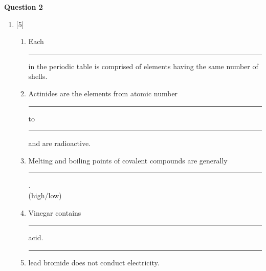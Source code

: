 \par
\noindent
\textbf{Question 2}\\
\begin{enumerate}[label=(\roman*)]

    \item \hfill [5]
        \begin{enumerate}[label=(\alph*)]
            \item Each \rule{1.5cm}{0.15mm} in the periodic table is comprised of elements 
                having the same number of shells.
            \item Actinides are the elements from atomic number \rule{1.5cm}{0.15mm} to 
                \rule{1.5cm}{0.15mm} and are radioactive.
            \item Melting and boiling points of covalent compounds are generally 
            \rule{1.5cm}{0.15mm}.\\ (high/low)
            \item Vinegar contains \rule{1.5cm}{0.15mm} acid.
            \item \rule{1.5cm}{0.15mm} lead bromide does not conduct electricity.
        \end{enumerate}

\end{enumerate}


